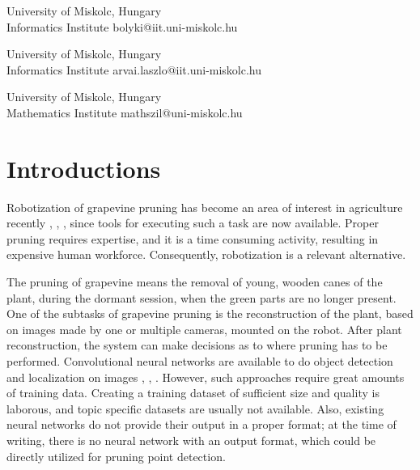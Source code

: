 \documentclass{PSAIE}%
\begin{document}
%

\fancyfoot{}

\noindent{} %

\noindent{}
{University of Miskolc, Hungary\\[0pt] Informatics Institute}
{bolyki@iit.uni-miskolc.hu}

\noindent{}
{University of Miskolc, Hungary\\[0pt] Informatics Institute}
{arvai.laszlo@iit.uni-miskolc.hu}

\noindent{}
{University of Miskolc, Hungary\\[0pt] Mathematics Institute}
{mathszil@uni-miskolc.hu}

\noindent\PSAIEreceived{\today}

\noindent{}

\noindent{}

\section{Introductions}
Robotization of grapevine pruning has become an area of interest in agriculture recently
\cite{botterill2017robot}, \cite{fernandes2021grapevine}, \cite{katyara2020reproducible}, since
tools for executing such a task are now available. Proper pruning requires expertise, and it is
a time consuming activity, resulting in expensive human workforce. Consequently, robotization is
a relevant alternative.

The pruning of grapevine means the removal of young, wooden canes of the plant, during the dormant session,
when the green parts are no longer present.
One of the subtasks of grapevine pruning is the reconstruction of the plant, based on images made by
one or multiple cameras, mounted on the robot. After plant reconstruction, the system can make decisions
as to where pruning has to be performed. Convolutional neural networks are available to do
object detection and localization on images \cite{glenn_jocher_2021_5563715}, \cite{matterport_maskrcnn_2017},
\cite{liu2016ssd}. However, such approaches require great amounts of training data. Creating a training
dataset of sufficient size and quality is laborous, and topic specific datasets are usually not available.
Also, existing neural networks do not provide their output in a proper format; at the time of writing,
there is no neural network with an output format, which could be directly utilized for pruning point
detection.
\end{document}
